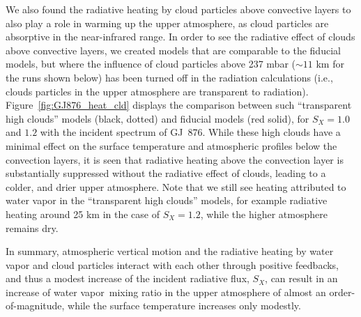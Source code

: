 \documentclass[11pt,numberedappendix,twocolappendix,]{emulateapj}
\def\water{H$_2$O }
\newcommand{\dsa}[1]{{\color{blue}#1}}
\newcommand{\wv}{{\color{orange}water vapor\ }}
\begin{document}
We also found the radiative heating by cloud particles above convective layers to also play a role in warming up the upper atmosphere, as cloud particles are absorptive in the near-infrared range. 
In order to see the radiative effect of clouds above convective layers, we created models that are comparable to the fiducial models, but where the  influence of cloud particles above 237 mbar ($\sim 11$ km for the runs shown below) has been turned off in the radiation calculations (i.e., clouds particles in the upper atmosphere are transparent to radiation). 
Figure~\ref{fig:GJ876_heat_cld} displays the comparison between such ``transparent high clouds'' models (black, dotted) and fiducial models (red solid), for $S_X=1.0$ and $1.2$ with the incident spectrum of GJ~876. 
While these high clouds have a minimal effect on the surface temperature and atmospheric profiles below the convection layers, it is seen that radiative heating above the convection layer is substantially suppressed without the radiative effect of clouds, leading to a colder, and drier upper atmosphere. 
Note that we still see heating attributed to water vapor in the ``transparent high clouds'' models, for example radiative heating around 25 km in the case of $S_X=1.2$, while the higher atmosphere remains dry. 

In summary, atmospheric vertical motion and the radiative heating by water vapor and cloud particles interact with each other through positive feedbacks, and thus a modest increase of the incident radiative flux, $S_X$, can result in  an increase of \wv mixing ratio in the upper atmosphere of almost an order-of-magnitude, while the surface temperature increases only modestly. 

\end{document}
